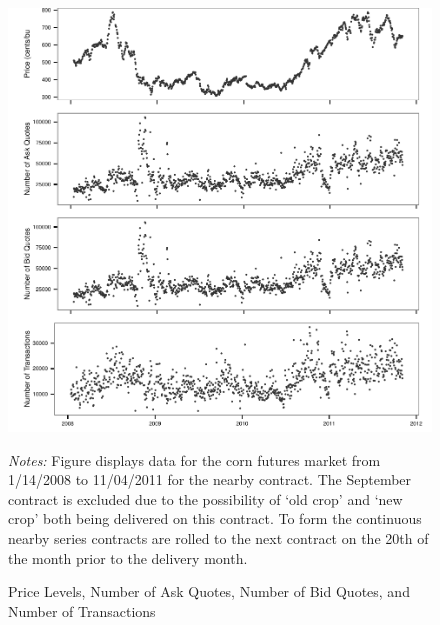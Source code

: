 \documentclass[review,12pt]{elsarticle}
\begin{document}
\begin{figure}[htbp]
\includegraphics[scale=0.85]{TablesFigures_files/figure-latex/unnamed-chunk-3-1.pdf}
{\footnotesize \emph{Notes:} Figure displays data for the corn futures market from 1/14/2008 to
11/04/2011 for the nearby contract. The September contract is excluded
due to the possibility of `old crop' and `new crop' both being delivered
on this contract. To form the continuous nearby series contracts are
rolled to the next contract on the 20th of the month prior to the
delivery month. \par}
\caption{Price Levels, Number of Ask Quotes, Number of Bid Quotes, and
Number of Transactions}

\end{figure}


\clearpage
\end{document}
